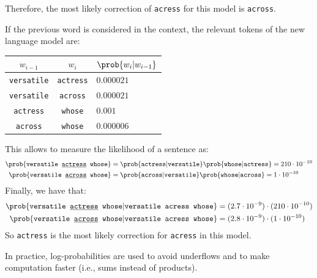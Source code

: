 \begin{example}
    Therefore, the most likely correction of \texttt{acress} for this model is \texttt{across}.

    If the previous word is considered in the context, the relevant tokens of the new language model are:
    \begin{table}[H]
        \centering
        \footnotesize
        \begin{tabular}{ccl}
            \toprule
            $w_{i-1}$ & $w_i$ & $\prob{w_i | w_{i-1}}$ \\
            \midrule
            \texttt{versatile} & \texttt{actress}   & $0.000021$ \\
            \texttt{versatile} & \texttt{across}    & $0.000021$ \\
            \texttt{actress}   & \texttt{whose}     & $0.001$ \\
            \texttt{across}    & \texttt{whose}     & $0.000006$ \\
            \bottomrule
        \end{tabular}
    \end{table}
    This allows to measure the likelihood of a sentence as:
    \[
        \begin{split}
            \prob{\texttt{versatile \underline{actress} whose}} &= \prob{\texttt{actress} | \texttt{versatile}} \prob{\texttt{whose} | \texttt{actress}} = 210 \cdot 10^{-10} \\
            \prob{\texttt{versatile \underline{across} whose}} &= \prob{\texttt{across} | \texttt{versatile}} \prob{\texttt{whose} | \texttt{across}} = 1 \cdot 10^{-10}
        \end{split}
    \]
    Finally, we have that:
    \[
        \begin{split}
            \prob{\texttt{versatile \underline{actress} whose} | \texttt{versatile acress whose}} &= (2.7 \cdot 10^{-9}) \cdot (210 \cdot 10^{-10}) \\
            \prob{\texttt{versatile \underline{across} whose} | \texttt{versatile acress whose}} &= (2.8 \cdot 10^{-9}) \cdot (1 \cdot 10^{-10}) \\
        \end{split}
    \]
    So \texttt{actress} is the most likely correction for \texttt{acress} in this model.
\end{example}


\begin{remark}
    In practice, log-probabilities are used to avoid underflows and to make computation faster (i.e., sums instead of products).
\end{remark}




